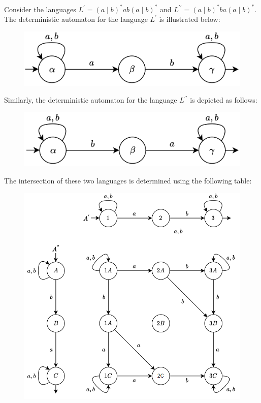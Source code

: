 \begin{example}
    Consider the languages $L^{\prime}=(a\mid b)^{\ast}ab(a\mid b)^{\ast}$ and $L^{\prime\prime}=(a\mid b)^{\ast}ba(a\mid b)^{\ast}$. 
    The deterministic automaton for the language $L^{\prime}$ is illustrated below:
    \begin{figure}[H]
        \centering
        \includegraphics[width=0.5\linewidth]{images/int.png}
    \end{figure}
    Similarly, the deterministic automaton for the language $L^{\prime\prime}$ is depicted as follows:
    \begin{figure}[H]
        \centering
        \includegraphics[width=0.5\linewidth]{images/int1.png}
    \end{figure}
    The intersection of these two languages is determined using the following table:
    \begin{figure}[H]
        \centering
        \includegraphics[width=0.65\linewidth]{images/int2.png}
    \end{figure}
\end{example}